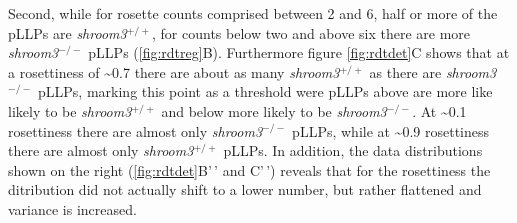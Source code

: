 \documentclass[10pt, b5paper, singlespacinge, twoside]{reedthesis} %
\theoremstyle{definition}
\theoremstyle{definition}
\theoremstyle{definition}
\theoremstyle{remark}
\begin{document}
Second, while for rosette counts comprised between 2 and 6, half or more of the pLLPs are \emph{shroom3}\(^{+/+}\), for counts below two and above six there are more \emph{shroom3}\(^{-/-}\) pLLPs (\ref{fig:rdtreg}B). Furthermore figure \ref{fig:rdtdet}C shows that at a rosettiness of \textasciitilde0.7 there are about as many \emph{shroom3}\(^{+/+}\) as there are \emph{shroom3}\(^{-/-}\) pLLPs, marking this point as a threshold were pLLPs above are more like likely to be \emph{shroom3}\(^{+/+}\) and below more likely to be \emph{shroom3}\(^{-/-}\). At \textasciitilde0.1 rosettiness there are almost only \emph{shroom3}\(^{-/-}\) pLLPs, while at \textasciitilde0.9 rosettiness there are almost only \emph{shroom3}\(^{+/+}\) pLLPs.
In addition, the data distributions shown on the right (\ref{fig:rdtdet}B'\,' and C'\,') reveals that for the rosettiness the ditribution did not actually shift to a lower number, but rather flattened and variance is increased.
\end{document}

